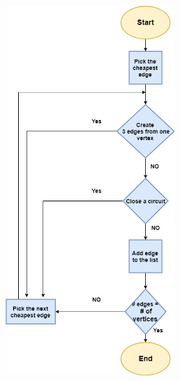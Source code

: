 \documentclass[12pt]{article}
\newcounter{subsubsubsection}[subsubsection]
\begin{document}
\begin{center}
	\includegraphics[width=11cm,height=14cm]{./assets/flowchart/cheapest.png}\\
\end{center}
\end{document}
